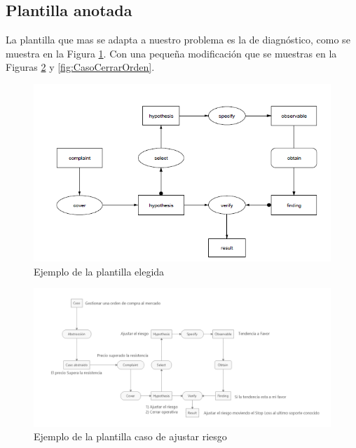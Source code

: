 \subsection{Plantilla anotada}

La plantilla que mas se adapta a nuestro problema es la de diagnóstico, como se muestra en la Figura \ref{fig:PlantillaEjemplo}. Con una pequeña modificación que se muestras en la Figuras \ref{fig:CasoMoverRiesgo} y \ref{fig:CasoCerrarOrden}.

\begin{figure}[H]
  \centering
  \includegraphics[scale=0.90]{imagenes/PlantillaEjemplo.png}
  \caption{\label{fig:PlantillaEjemplo}Ejemplo de la plantilla elegida}
\end{figure}

\begin{figure}[H]
  \centering
  \includegraphics[scale=0.50]{imagenes/CasoMoverRiesgo.png}
  \caption{\label{fig:CasoMoverRiesgo}Ejemplo de la plantilla caso de ajustar riesgo}
\end{figure}

